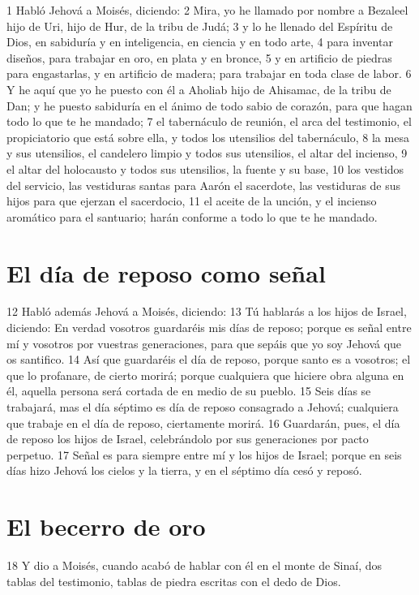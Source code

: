 1 Habló Jehová a Moisés, diciendo:
2 Mira, yo he llamado por nombre a Bezaleel hijo de Uri, hijo de Hur, de la tribu de Judá;
3 y lo he llenado del Espíritu de Dios, en sabiduría y en inteligencia, en ciencia y en todo arte,
4 para inventar diseños, para trabajar en oro, en plata y en bronce,
5 y en artificio de piedras para engastarlas, y en artificio de madera; para trabajar en toda clase de labor.
6 Y he aquí que yo he puesto con él a Aholiab hijo de Ahisamac, de la tribu de Dan; y he puesto sabiduría en el ánimo de todo sabio de corazón, para que hagan todo lo que te he mandado;
7 el tabernáculo de reunión, el arca del testimonio, el propiciatorio que está sobre ella, y todos los utensilios del tabernáculo,
8 la mesa y sus utensilios, el candelero limpio y todos sus utensilios, el altar del incienso,
9 el altar del holocausto y todos sus utensilios, la fuente y su base,
10 los vestidos del servicio, las vestiduras santas para Aarón el sacerdote, las vestiduras de sus hijos para que ejerzan el sacerdocio,
11 el aceite de la unción, y el incienso aromático para el santuario; harán conforme a todo lo que te he mandado.

\section*{El día de reposo como señal}

12 Habló además Jehová a Moisés, diciendo:
13 Tú hablarás a los hijos de Israel, diciendo: En verdad vosotros guardaréis mis días de reposo; porque es señal entre mí y vosotros por vuestras generaciones, para que sepáis que yo soy Jehová que os santifico.
14 Así que guardaréis el día de reposo, porque santo es a vosotros; el que lo profanare, de cierto morirá; porque cualquiera que hiciere obra alguna en él, aquella persona será cortada de en medio de su pueblo.
15 Seis días se trabajará, mas el día séptimo es día de reposo consagrado a Jehová; cualquiera que trabaje en el día de reposo, ciertamente morirá.
16 Guardarán, pues, el día de reposo los hijos de Israel, celebrándolo por sus generaciones por pacto perpetuo.
17 Señal es para siempre entre mí y los hijos de Israel; porque en seis días hizo Jehová los cielos y la tierra, y en el séptimo día cesó y reposó.

\section*{El becerro de oro}

18 Y dio a Moisés, cuando acabó de hablar con él en el monte de Sinaí, dos tablas del testimonio, tablas de piedra escritas con el dedo de Dios.

